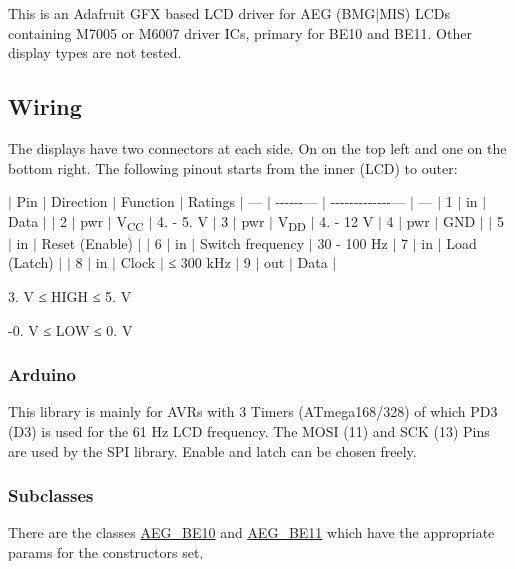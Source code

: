 This is an Adafruit G\+FX based L\+CD driver for A\+EG (B\+M\+G$\vert$\+M\+IS) L\+C\+Ds containing M7005 or M6007 driver I\+Cs, primary for B\+E10 and B\+E11. Other display types are not tested.

\subsection*{Wiring}

The displays have two connectors at each side. On on the top left and one on the bottom right. The following pinout starts from the inner (L\+CD) to outer\+:

$\vert$ Pin $\vert$ Direction $\vert$ Function $\vert$ Ratings $\vert$ --- $\vert$ -\/-\/-\/-\/-\/-\/--- $\vert$ -\/-\/-\/-\/-\/-\/-\/-\/-\/-\/-\/-\/-\/--- $\vert$ --- $\vert$ 1 $\vert$ in $\vert$ Data $\vert$ $\vert$ 2 $\vert$ pwr $\vert$ V\textsubscript{CC} $\vert$ 4. -\/ 5. V $\vert$ 3 $\vert$ pwr $\vert$ V\textsubscript{DD} $\vert$ 4. -\/ 12 V $\vert$ 4 $\vert$ pwr $\vert$ G\+ND $\vert$ $\vert$ 5 $\vert$ in $\vert$ Reset (Enable) $\vert$ $\vert$ 6 $\vert$ in $\vert$ Switch frequency $\vert$ 30 -\/ 100 Hz $\vert$ 7 $\vert$ in $\vert$ Load (Latch) $\vert$ $\vert$ 8 $\vert$ in $\vert$ Clock $\vert$ ≤ 300 k\+Hz $\vert$ 9 $\vert$ out $\vert$ Data $\vert$

3. V ≤ H\+I\+GH ≤ 5. V

-\/0. V ≤ L\+OW ≤ 0. V

\subsubsection*{Arduino}

This library is mainly for A\+V\+Rs with 3 Timers (A\+Tmega168/328) of which P\+D3 (D3) is used for the 61 Hz L\+CD frequency. The M\+O\+SI (11) and S\+CK (13) Pins are used by the S\+PI library. Enable and latch can be chosen freely.

\subsubsection*{Subclasses}

There are the classes {\ttfamily \mbox{\hyperlink{class_a_e_g___b_e10}{A\+E\+G\+\_\+\+B\+E10}}} and {\ttfamily \mbox{\hyperlink{class_a_e_g___b_e11}{A\+E\+G\+\_\+\+B\+E11}}} which have the appropriate params for the constructors set. 